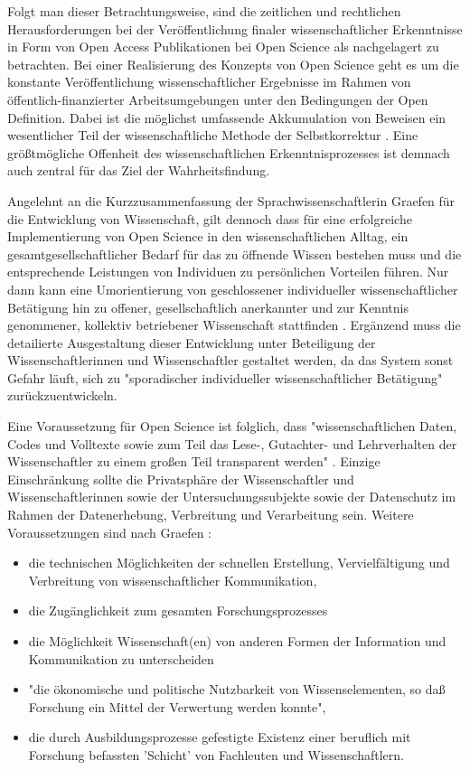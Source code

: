 Folgt man dieser Betrachtungsweise, sind die zeitlichen und rechtlichen Herausforderungen bei der Veröffentlichung finaler wissenschaftlicher Erkenntnisse in Form von Open Access Publikationen bei Open Science als nachgelagert zu betrachten. Bei einer Realisierung des Konzepts von Open Science geht es um die konstante Veröffentlichung wissenschaftlicher Ergebnisse im Rahmen von öffentlich-finanzierter Arbeitsumgebungen unter den Bedingungen der Open Definition. Dabei ist die möglichst umfassende Akkumulation von Beweisen ein wesentlicher Teil der wissenschaftliche Methode der Selbstkorrektur \cite{Nosek_2015}. Eine größtmögliche Offenheit des wissenschaftlichen Erkenntnisprozesses ist demnach auch zentral für das Ziel der Wahrheitsfindung.

Angelehnt an die Kurzzusammenfassung der Sprachwissenschaftlerin Graefen für die Entwicklung von Wissenschaft, gilt dennoch dass für eine erfolgreiche Implementierung von Open Science in den wissenschaftlichen Alltag, ein gesamtgesellschaftlicher Bedarf für das zu öffnende Wissen bestehen muss und die entsprechende Leistungen von Individuen zu persönlichen Vorteilen führen. Nur dann kann eine Umorientierung von geschlossener individueller wissenschaftlicher Betätigung hin zu offener, gesellschaftlich anerkannter und zur Kenntnis genommener, kollektiv betriebener Wissenschaft stattfinden \cite{graefen2007_wissenschaftliche_artikel}. Ergänzend muss die detailierte Ausgestaltung dieser Entwicklung unter Beteiligung der Wissenschaftlerinnen und Wissenschaftler gestaltet werden, da das System sonst Gefahr läuft, sich zu "sporadischer individueller wissenschaftlicher Betätigung" \cite{graefen2007_wissenschaftliche_artikel} zurückzuentwickeln.

Eine Voraussetzung für Open Science ist folglich, dass "wissenschaftlichen Daten, Codes und Volltexte sowie zum Teil das Lese-, Gutachter- und Lehrverhalten der Wissenschaftler zu einem großen Teil transparent werden" \cite{brembs2015open}. Einzige Einschränkung sollte die Privatsphäre der Wissenschaftler und Wissenschaftlerinnen sowie der Untersuchungssubjekte sowie der Datenschutz im Rahmen der Datenerhebung, Verbreitung und Verarbeitung sein. Weitere Voraussetzungen sind nach Graefen \cite{graefen2007_wissenschaftliche_artikel}:
\begin{itemize}
\item die technischen Möglichkeiten der schnellen Erstellung, Vervielfältigung und Verbreitung von wissenschaftlicher Kommunikation,
\item die Zugänglichkeit zum gesamten Forschungsprozesses
\item die Möglichkeit Wissenschaft(en) von anderen Formen der Information und Kommunikation zu unterscheiden
\item "die ökonomische und politische Nutzbarkeit von Wissenselementen, so daß
Forschung ein Mittel der Verwertung werden konnte",
\item die durch Ausbildungsprozesse gefestigte Existenz einer beruflich mit Forschung befassten 'Schicht' von Fachleuten und Wissenschaftlern.
\end{itemize}

